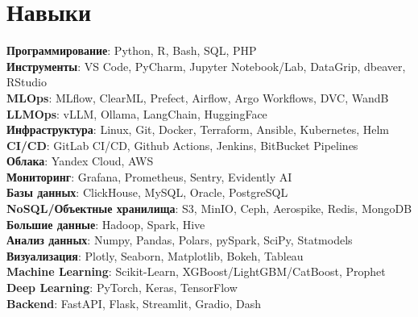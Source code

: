 \section{Навыки}
\begin{itemize}[leftmargin=0.15in, label={}]
  {\item{
        \textbf{Программирование}{: Python, R, Bash, SQL, PHP} \\
        \textbf{Инструменты}{: VS Code, PyCharm, Jupyter Notebook/Lab, DataGrip, dbeaver, RStudio} \\
        \textbf{MLOps}{: MLflow, ClearML, Prefect, Airflow, Argo Workflows, DVC, WandB} \\
        \textbf{LLMOps}{: vLLM, Ollama, LangChain, HuggingFace} \\
        \textbf{Инфраструктура}{: Linux, Git, Docker, Terraform, Ansible, Kubernetes, Helm} \\
        \textbf{CI/CD}{: GitLab CI/CD, Github Actions, Jenkins, BitBucket Pipelines} \\
        \textbf{Облака}{: Yandex Cloud, AWS} \\
        \textbf{Мониторинг}{: Grafana, Prometheus, Sentry, Evidently AI} \\
        \textbf{Базы данных}{: ClickHouse, MySQL, Oracle, PostgreSQL} \\
        \textbf{NoSQL/Объектные хранилища}{: S3, MinIO, Ceph, Aerospike, Redis, MongoDB} \\
        \textbf{Большие данные}{: Hadoop, Spark, Hive} \\
        \textbf{Анализ данных}{: Numpy, Pandas, Polars, pySpark, SciPy, Statmodels} \\
        \textbf{Визуализация}{: Plotly, Seaborn, Matplotlib, Bokeh, Tableau} \\
        \textbf{Machine Learning}{: Scikit-Learn, XGBoost/LightGBM/CatBoost, Prophet} \\
        \textbf{Deep Learning}{: PyTorch, Keras, TensorFlow} \\
        \textbf{Backend}{: FastAPI, Flask, Streamlit, Gradio, Dash} \\
        }}
\end{itemize}